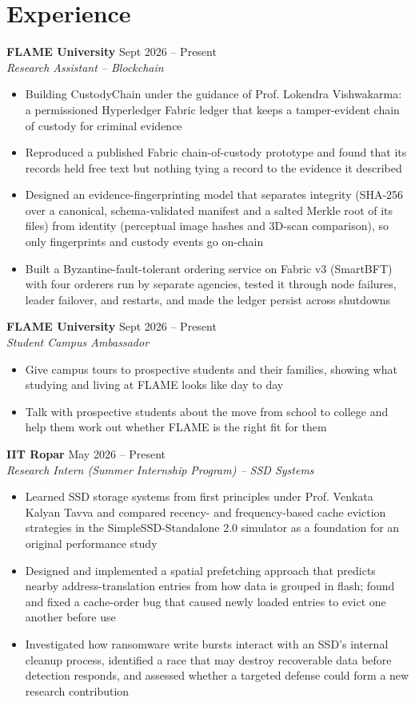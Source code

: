 \documentclass[10pt,a4paper]{article}
\newcommand{\experience}[4]{
    \textbf{#1} \hfill #2\\
    \textit{#3} \hfill #4\\[0.1em]
}
\begin{document}
\section*{Experience}

\experience{FLAME University}{Sept 2026 -- Present}{Research Assistant -- Blockchain}{}
\begin{itemize}[leftmargin=*, itemsep=0pt, parsep=0pt, topsep=1pt]
    \item Building CustodyChain under the guidance of Prof. Lokendra Vishwakarma: a permissioned Hyperledger Fabric ledger that keeps a tamper-evident chain of custody for criminal evidence
    \item Reproduced a published Fabric chain-of-custody prototype and found that its records held free text but nothing tying a record to the evidence it described
    \item Designed an evidence-fingerprinting model that separates integrity (SHA-256 over a canonical, schema-validated manifest and a salted Merkle root of its files) from identity (perceptual image hashes and 3D-scan comparison), so only fingerprints and custody events go on-chain
    \item Built a Byzantine-fault-tolerant ordering service on Fabric v3 (SmartBFT) with four orderers run by separate agencies, tested it through node failures, leader failover, and restarts, and made the ledger persist across shutdowns
\end{itemize}

\experience{FLAME University}{Sept 2026 -- Present}{Student Campus Ambassador}{}
\begin{itemize}[leftmargin=*, itemsep=0pt, parsep=0pt, topsep=1pt]
    \item Give campus tours to prospective students and their families, showing what studying and living at FLAME looks like day to day
    \item Talk with prospective students about the move from school to college and help them work out whether FLAME is the right fit for them
\end{itemize}

\experience{IIT Ropar}{May 2026 -- Present}{Research Intern (Summer Internship Program) -- SSD Systems}{}
\begin{itemize}[leftmargin=*, itemsep=0pt, parsep=0pt, topsep=1pt]
    \item Learned SSD storage systems from first principles under Prof. Venkata Kalyan Tavva and compared recency- and frequency-based cache eviction strategies in the SimpleSSD-Standalone 2.0 simulator as a foundation for an original performance study
    \item Designed and implemented a spatial prefetching approach that predicts nearby address-translation entries from how data is grouped in flash; found and fixed a cache-order bug that caused newly loaded entries to evict one another before use
    \item Investigated how ransomware write bursts interact with an SSD's internal cleanup process, identified a race that may destroy recoverable data before detection responds, and assessed whether a targeted defense could form a new research contribution
\end{itemize}
\end{document}
